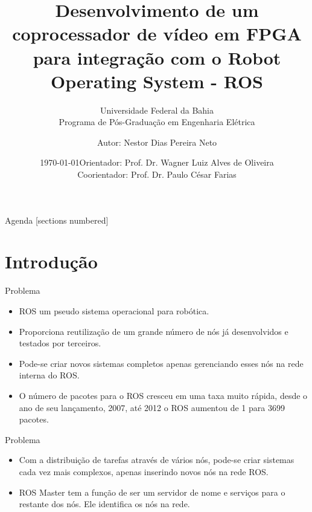\documentclass[10pt]{beamer}
\title{Desenvolvimento de um coprocessador de vídeo em FPGA para integração com o Robot Operating System - ROS}
\subtitle{Universidade Federal da Bahia\\
            Programa de Pós-Graduação em Engenharia Elétrica}
\date{\today}
\date{Orientador: Prof. Dr. Wagner Luiz Alves de Oliveira\\Coorientador: Prof. Dr. Paulo César Farias}
\author{Autor: Nestor Dias Pereira Neto}
\institute{Salvador, 5 de dezembro de 2022}
\begin{document}
\maketitle

\begin{frame}{Agenda}
  [sections numbered]
  \tableofcontents[hideallsubsections]
\end{frame}


\section{Introdução}

{
\begin{frame}[fragile]{Problema}
    \begin{itemize}
      \item ROS um pseudo sistema operacional para robótica.
      
      \item Proporciona reutilização de um grande número de nós já desenvolvidos e testados por terceiros.
      
      \item Pode-se criar novos sistemas completos apenas gerenciando esses nós na rede interna do ROS.
      
      \item O número de pacotes para o ROS cresceu em uma taxa muito rápida, desde o ano de seu lançamento, 2007, até 2012 o ROS aumentou de 1 para 3699 pacotes.
    \end{itemize}

 \nocite{LwIP,freertosbook,ROSeffect,PDSfpga,NiosIIbook,ROSfpga}
\end{frame}
}

{
\begin{frame}[fragile]{Problema}
\begin{itemize}
    \item Com a distribuição de tarefas através de vários nós, pode-se criar sistemas cada vez mais complexos, apenas inserindo novos nós na rede ROS.
  
   \item ROS Master tem a função de ser um servidor de nome e serviços para o restante dos nós. Ele identifica os nós na rede.
\end{itemize}
  
\end{frame}
}
\end{document}
